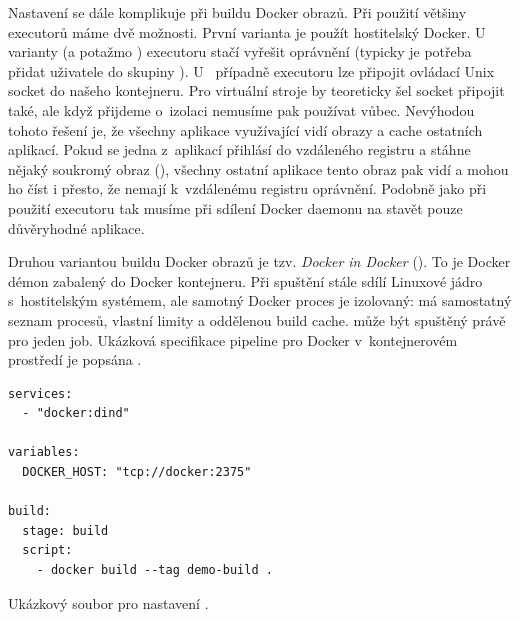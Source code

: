         \label{sec:gitlab-ci-docker}
        Nastavení \CI se dále komplikuje při buildu Docker obrazů. Při použití většiny executorů máme dvě možnosti. První varianta je použít hostitelský Docker. U~ varianty (a potažmo ) executoru stačí vyřešit oprávnění (typicky je potřeba přidat uživatele  do skupiny ). U~ případně  executoru lze připojit ovládací Unix socket  do našeho kontejneru. Pro virtuální stroje by teoreticky šel socket připojit také, ale když přijdeme o~izolaci nemusíme pak  používat vůbec. Nevýhodou tohoto řešení je, že všechny aplikace využívající \CI vidí obrazy a cache ostatních aplikací. Pokud se jedna z~aplikací přihlásí do vzdáleného registru a stáhne nějaký soukromý obraz (), všechny ostatní aplikace tento obraz pak vidí a mohou ho číst i přesto, že nemají k~vzdálenému registru oprávnění. Podobně jako při použití  executoru tak musíme při sdílení Docker daemonu na \CI stavět pouze důvěryhodné aplikace.

        Druhou variantou buildu Docker obrazů je tzv. \textit{Docker in Docker} (). To je Docker démon zabalený do Docker kontejneru. Při spuštění stále sdílí Linuxové jádro s~hostitelským systémem, ale samotný Docker proces je izolovaný: má samostatný seznam procesů, vlastní limity a oddělenou build cache.  může být spuštěný právě pro jeden job. Ukázková specifikace pipeline pro Docker v~kontejnerovém prostředí je popsána .

        \begin{iffigure}
            \begin{verbatim}
services:
  - "docker:dind"

variables:
  DOCKER_HOST: "tcp://docker:2375"

build:
  stage: build
  script:
    - docker build --tag demo-build .
            \end{verbatim}
            \caption{Ukázkový soubor  pro nastavení .}
            \label{fig:gitlab-dind}
        \end{iffigure}

